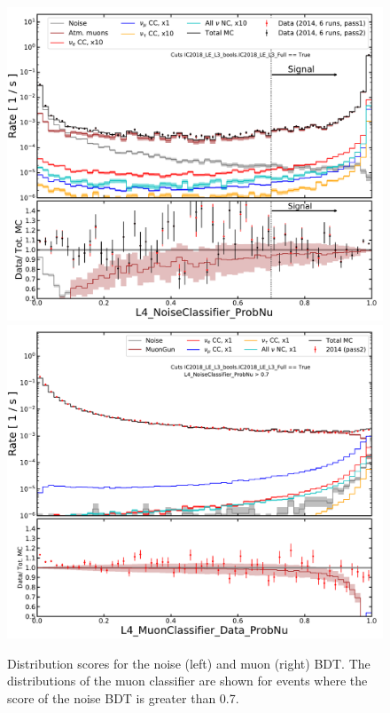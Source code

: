 \begin{figure}
    \centering
    \includegraphics[width=7 cm]{figures/icecube/selection/L4_noiseBDT_L4_NoiseClassifier_ProbNu.pdf}
    \includegraphics[width=7 cm]{figures/icecube/selection/L4_muon_L4_MuonClassifier_Data_ProbNu.pdf}
    \caption{Distribution scores for the noise (left) and muon (right) BDT. The distributions of the muon classifier are shown for events where the score of the noise BDT is greater than 0.7.}
    \label{fig:l4-bdt-output}
\end{figure}

